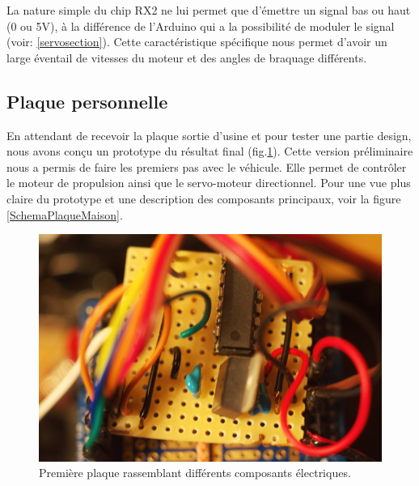 \documentclass[a4paper,11pt]{report}
\begin{document}
{La nature simple du chip RX2 ne lui permet que d'émettre un signal bas ou haut
(0 ou 5V), à la différence de l'Arduino qui a la possibilité de moduler le
signal (voir: \ref{servosection}). Cette caractéristique spécifique nous permet
d'avoir un large éventail de vitesses du moteur et des angles de braquage
différents. 



\subsection{Plaque personnelle}
En attendant de recevoir la plaque sortie d'usine et pour tester une partie
design, nous avons conçu un prototype du résultat final
(fig.\ref{PPFigure}). Cette version préliminaire nous a permis de faire les
premiers
pas avec le véhicule. Elle permet de contrôler le moteur de propulsion ainsi
que le servo-moteur directionnel.
Pour une vue plus claire du prototype et une description des composants
principaux, voir la figure \ref{SchemaPlaqueMaison}. 

\begin{figure}[h]
\centering
\includegraphics[width=1.0\textwidth]{DSC_1116res}
    \caption[Prototype du PCB]{\label{PPFigure}Première plaque rassemblant différents composants électriques. 
    }
\end{figure}
 
}
\end{document}

